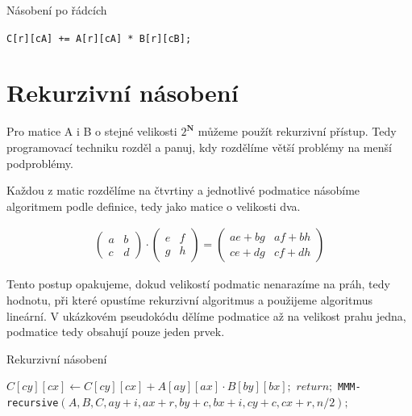 \begin{algorithm}[H]
	\caption{Násobení po řádcích}\label{mmm-by-rows}
	\begin{algorithmic}[1]
			\State \texttt{C[r][cA] += A[r][cA] * B[r][cB];}
		\EndFor
	\EndFor
\EndFor
		\EndProcedure
	\end{algorithmic}
\end{algorithm}


\section{Rekurzivní násobení}

Pro matice A i B o stejné velikosti $ {2^\mathbf{N}} $ můžeme použít rekurzivní přístup. Tedy programovací techniku rozděl a panuj, kdy rozdělíme větší problémy na menší podproblémy.

Každou z matic rozdělíme na čtvrtiny a jednotlivé podmatice násobíme algoritmem podle definice, tedy jako matice o velikosti dva.

\label{RecMul}
\label{2x2MMM}
\begin{align}
\begin{pmatrix}
 a & b \\
 c & d
\end{pmatrix} \cdot \begin{pmatrix}
 e & f \\
 g & h
\end{pmatrix} = \begin{pmatrix}
 ae+bg & af+bh \\
 ce+dg & cf+dh
\end{pmatrix}
\end{align}

Tento postup opakujeme, dokud velikostí podmatic nenarazíme na práh, tedy hodnotu, při které opustíme rekurzivní algoritmus a použijeme algoritmus lineární. V ukázkovém pseudokódu dělíme podmatice až na velikost prahu jedna, podmatice tedy obsahují pouze jeden prvek.

\begin{algorithm}[H]
	\caption{Rekurzivní násobení}\label{mmm-recursive}
	\begin{algorithmic}[1]
			\State \texttt{$C[cy][cx]\gets C[cy][cx] + A[ay][ax] \cdot B[by][bx];$}
			\State \texttt{$return;$}
		\EndIf
					\State \texttt{MMM-recursive$(A,B,C,ay+i,ax+r,by+c,bx+i,cy+c,cx+r,n/2);$}
				\EndFor
			\EndFor
		\EndFor
		\EndProcedure
	\end{algorithmic}
\end{algorithm}


